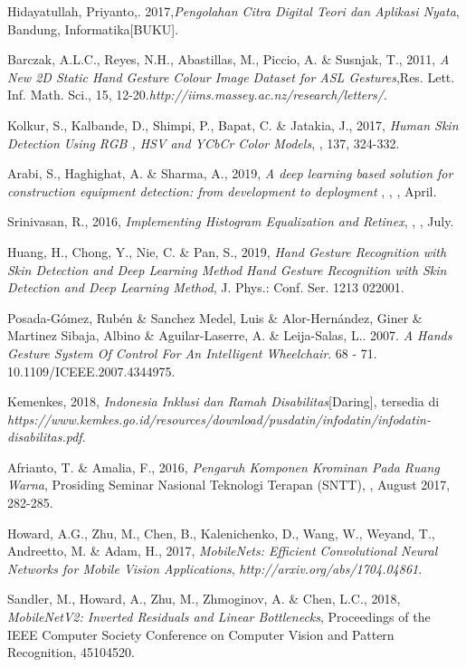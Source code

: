 \documentclass{tesisilkomugm}
\begin{document}
\begin{thebibliography}{99}
Hidayatullah, Priyanto,. 2017,\emph{Pengolahan Citra Digital Teori dan Aplikasi Nyata}, 
Bandung, Informatika[BUKU].

Barczak, A.L.C., Reyes, N.H., Abastillas, M., Piccio, A. \& Susnjak, T., 2011, \emph{A New 2D Static Hand Gesture Colour Image Dataset for ASL Gestures},Res. Lett. Inf. Math. Sci., 15, 12-20.\emph{http://iims.massey.ac.nz/research/letters/}.

Kolkur, S., Kalbande, D., Shimpi, P., Bapat, C. \& Jatakia, J., 2017, \emph{Human Skin Detection Using RGB , HSV and YCbCr Color Models}, , 137, 324-332.

Arabi, S., Haghighat, A. \& Sharma, A., 2019, \emph{A deep learning based solution for construction equipment detection: from development to deployment} , , , April.

Srinivasan, R., 2016, \emph{Implementing Histogram Equalization and Retinex}, , , July.

Huang, H., Chong, Y., Nie, C. \& Pan, S., 2019, \emph{Hand Gesture Recognition with Skin Detection and Deep Learning Method Hand Gesture Recognition with Skin Detection and Deep Learning Method}, J. Phys.: Conf. Ser. 1213 022001.

Posada-Gómez, Rubén \& Sanchez Medel, Luis \& Alor-Hernández, Giner \& Martinez Sibaja, Albino \& Aguilar-Laserre, A. \& Leija-Salas, L.. 2007. \emph{A Hands Gesture System Of Control For An Intelligent Wheelchair}. 68 - 71. 10.1109/ICEEE.2007.4344975. 

Kemenkes, 2018, \emph{Indonesia Inklusi  dan Ramah Disabilitas}[Daring], tersedia di \emph{https://www.kemkes.go.id/resources/download/pusdatin/infodatin/infodatin-disabilitas.pdf}.

Afrianto, T. \& Amalia, F., 2016, \emph{Pengaruh Komponen Krominan Pada Ruang Warna}, Prosiding Seminar Nasional Teknologi Terapan (SNTT), , August 2017, 282-285.

Howard, A.G., Zhu, M., Chen, B., Kalenichenko, D., Wang, W., Weyand, T., Andreetto, M. \& Adam, H., 2017, \emph{MobileNets: Efficient Convolutional Neural Networks for Mobile Vision Applications}, \emph{http://arxiv.org/abs/1704.04861}.

Sandler, M., Howard, A., Zhu, M., Zhmoginov, A. \& Chen, L.C., 2018, \emph{MobileNetV2: Inverted Residuals and Linear Bottlenecks}, Proceedings of the IEEE Computer Society Conference on Computer Vision and Pattern Recognition, 45104520.


\end{thebibliography}
\end{document}
